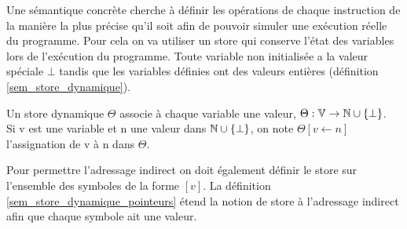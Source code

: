 Une sémantique concrète cherche à définir les opérations de chaque instruction de la manière la plus précise qu'il soit afin de pouvoir simuler une exécution réelle du programme.
Pour cela on va utiliser un store qui conserve l'état des variables lors de l'exécution du programme.
Toute variable non initialisée a la valeur spéciale $\bot$ tandis que les variables définies ont des valeurs entières (définition \ref{sem_store_dynamique}).

\begin{defi}
 Un store dynamique $\Theta$ associe à chaque variable une valeur, $\Theta:\mathbb V\rightarrow\mathbb N\cup\{\bot\}$.\\
 Si v est une variable et n une valeur dans $\mathbb N\cup\{\bot\}$, on note $\Theta[v\leftarrow n]$ l'assignation de v à n dans $\Theta$.
\label{sem_store_dynamique}
\end{defi}

Pour permettre l'adressage indirect on doit également définir le store sur l'ensemble des symboles de la forme $[v]$.
La définition \ref{sem_store_dynamique_pointeurs} étend la notion de store à l'adressage indirect afin que chaque symbole ait une valeur.



